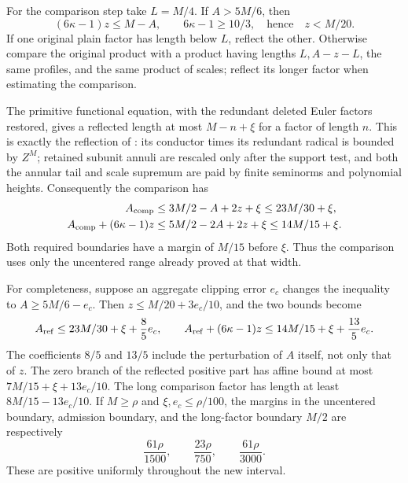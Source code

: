 For the comparison step take $L=M/4$. If $A>5M/6$, then
\[
 (6\kappa-1)z\le M-A,\qquad 6\kappa-1\ge10/3,
 \quad\text{hence}\quad z<M/20 .
\]
If one original plain factor has length below $L$, reflect the other.
Otherwise compare the original product with a product having lengths
$L,A-z-L$, the same profiles, and the same product of scales; reflect
its longer factor when estimating the comparison.

The primitive functional equation, with the redundant deleted Euler
factors restored, gives a reflected length at most $M-n+\xi$ for
a factor of length $n$. This is exactly the reflection of
\cite[Section 18.1]{OAI26}: its conductor times its redundant radical
is bounded by $Z^M$; retained subunit annuli are rescaled only after
the support test, and both the annular tail and scale supremum are
paid by finite seminorms and polynomial heights.
Consequently the comparison has
\begin{align}
 A_{\rm comp}&\le3M/2-A+2z+\xi\le23M/30+\xi,\label{adp:comparison-a}\\
 A_{\rm comp}+(6\kappa-1)z
 &\le5M/2-2A+2z+\xi\le14M/15+\xi.\label{adp:comparison-admit}
\end{align}
Both required boundaries have a margin of $M/15$ before $\xi$.
Thus the comparison uses only the uncentered range already proved
at that width.

For completeness, suppose an aggregate clipping error $e_c$ changes
the inequality to $A\ge5M/6-e_c$. Then
$z\le M/20+3e_c/10$, and the two bounds become
\begin{equation}\label{adp:clipping}
 A_{\rm ref}\le23M/30+\xi+\frac85e_c,\qquad
 A_{\rm ref}+(6\kappa-1)z
       \le14M/15+\xi+\frac{13}{5}e_c .
\end{equation}
The coefficients $8/5$ and $13/5$ include the perturbation of $A$
itself, not only that of $z$. The zero branch of the reflected
positive part has affine bound at most
$7M/15+\xi+13e_c/10$. The long comparison factor has length at least
$8M/15-13e_c/10$. If $M\ge\rho$ and $\xi,e_c\le\rho/100$, the
margins in the uncentered boundary, admission boundary, and the
long-factor boundary $M/2$ are respectively
\[
 \frac{61\rho}{1500},\qquad
 \frac{23\rho}{750},\qquad
 \frac{61\rho}{3000}.
\]
These are positive uniformly throughout the new interval.
